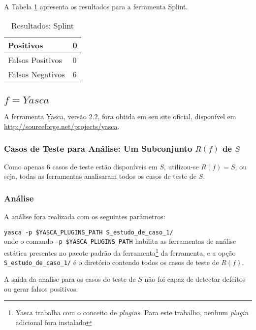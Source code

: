 A Tabela \ref{tabela_splint} apresenta os resultados para a ferramenta Splint.
\begin{table}[h]
\caption{Resultados: Splint}
  \centering
\begin{tabular}{l | l}
  \hline
  Positivos\index{positivo} & 0 \\ \hline
  Falsos Positivos\index{falso positivo} & 0 \\ \hline
  Falsos Negativos\index{falso negativo} & 6 \\
  \hline
\end{tabular}
\label{tabela_splint}
\end{table}

\subsection{$f = Yasca$}

A ferramenta Yasca, versão 2.2, fora obtida em seu site oficial, disponível em \url{http://sourceforge.net/projects/yasca}.

\subsubsection{Casos de Teste para Análise: Um Subconjunto $R(f)$ de $S$}

Como apenas 6 casos de teste estão disponíveis em $S$, utilizou-se $R(f) = S$, ou seja, todas as ferramentas analisaram todos os casos de teste de $S$.

\subsubsection{Análise}

A análise fora realizada com os seguintes parâmetros:

\lstinline[mathescape=false]{yasca -p $YASCA_PLUGINS_PATH S_estudo_de_caso_1/}\\
onde o comando \lstinline[mathescape=false]{-p $YASCA_PLUGINS_PATH} habilita as ferramentas de análise estática presentes no pacote padrão da ferramenta\footnote{Yasca trabalha com o conceito de \textit{plugins}. Para este trabalho, nenhum \textit{plugin} adicional fora instalado} da ferramenta, e a opção \lstinline{S_estudo_de_caso_1/} é o diretório contendo todos os casos de teste de $R(f)$.

A saída da analise para os casos de teste de $S$ não foi capaz de detectar defeitos ou gerar falsos positivos.

